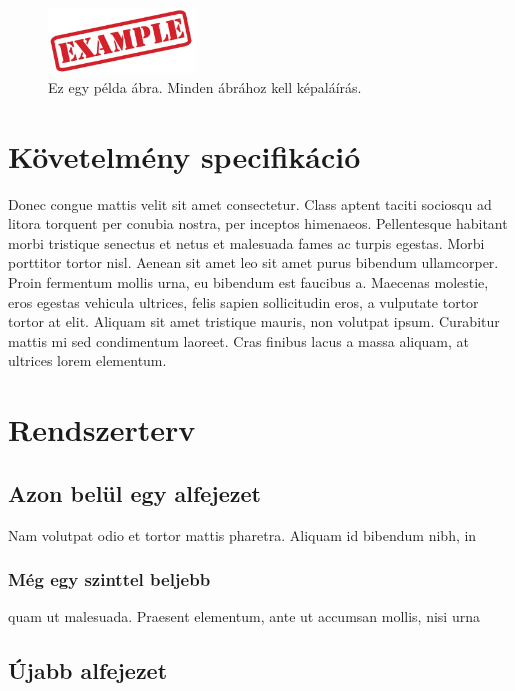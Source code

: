 \documentclass[a4paper,12pt,oneside]{report}
\begin{document}
\begin{figure}[htbp]
	\centering
	\includegraphics[width=0.35\textwidth]{fig/example.png}
	\caption{Ez egy példa ábra. Minden ábrához kell képaláírás.}
	\label{fig-example}
\end{figure}

\chapter{Követelmény specifikáció}

Donec congue mattis velit sit amet consectetur. Class aptent taciti sociosqu ad
litora torquent per conubia nostra, per inceptos himenaeos. Pellentesque
habitant morbi tristique senectus et netus et malesuada fames ac turpis
egestas. Morbi porttitor tortor nisl. Aenean sit amet leo sit amet purus
bibendum ullamcorper. Proin fermentum mollis urna, eu bibendum est faucibus a.
Maecenas molestie, eros egestas vehicula ultrices, felis sapien sollicitudin
eros, a vulputate tortor tortor at elit. Aliquam sit amet tristique mauris, non
volutpat ipsum. Curabitur mattis mi sed condimentum laoreet. Cras finibus lacus
a massa aliquam, at ultrices lorem elementum.


\chapter{Rendszerterv}

\section{Azon belül egy alfejezet}

Nam volutpat odio et tortor mattis pharetra. Aliquam id bibendum nibh, in

\subsection{Még egy szinttel beljebb}

quam ut malesuada. Praesent elementum, ante ut accumsan mollis, nisi urna

\section{Újabb alfejezet}
\end{document}

